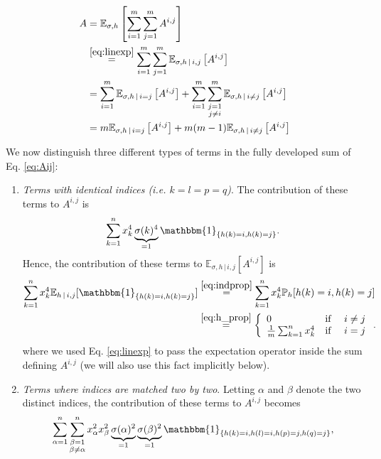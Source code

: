 \documentclass[10pt,usenames,dvipsnames]{article}
\newcommand{\Pbb}{\mathbb{P}}
\newcommand{\Ebb}{\mathbb{E}}
\newcommand{\ind}{\mathbbm{1}} %
\newenvironment{exercise}[2][Exercise]{\begin{trivlist}
  \item[\hskip \labelsep {\bfseries #1}\hskip \labelsep {\bfseries #2.}]}{\end{trivlist}}
\begin{document}
\begin{exercise}{2b}
		\begin{align}
		\label{eq:A}
		A 	& =  \Ebb_{\sigma, h}\left[ \sum_{i=1}^m \sum_{j=1}^m A^{i,j} \right] \nonumber \\
			& \overset{\eqref{eq:linexp}}{=} \sum_{i=1}^m \sum_{j=1}^m\Ebb_{\sigma, h\, | \, i,j}\left[ A^{i,j} \right] \nonumber \\
			& =  \sum_{i=1}^m \Ebb_{\sigma, h\, | \, i=j}\left[ A^{i,j} \right] + \sum_{i=1}^m \sum_{\substack{j=1 \\ j \neq i}}^m\Ebb_{\sigma, h\, | \, i\neq j}\left[ A^{i,j} \right] \nonumber \\
			& = m \Ebb_{\sigma, h \, | \, i=j}\left[ A^{i,j} \right] + m(m-1)\Ebb_{\sigma, h \, | \, i\neq j}\left[ A^{i,j} \right]
		\end{align}
		
		We now distinguish three different types of terms in the fully developed sum of Eq. \eqref{eq:Aij}:
		\begin{enumerate}
			\item \textit{Terms with identical indices (i.e. $k=l=p=q$)}. The contribution of these terms to $A^{i,j}$ is
			$$
			\sum_{k=1}^n x_k^4 \underbrace{\sigma(k)^4}_{=1} \ind_{\{h(k)=i, h(k)=j \}}.
			$$
			Hence, the contribution of these terms to $\Ebb_{\sigma, h\, | \, i,j} [A^{i,j}]$ is 
			\begin{align}
			\sum_{k=1}^n x_k^4  \Ebb_{h\, | \, i,j}[\ind_{\{h(k)=i, h(k)=j \}} ] 
			& \overset{\eqref{eq:indprop}}{=} \sum_{k=1}^n x_k^4  \Pbb_{h}[h(k)=i, h(k)=j ]
			\nonumber \\
			& \overset{\eqref{eq:h_prop}}{=} \left\{ 
				\begin{array}{lcl}
					0 & \mbox{if } & i\neq j \\
					\frac{1}{m}\sum_{k=1}^n x_k^4 & \mbox{if } & i = j \label{eq:A1} \\
				\end{array}\right..
			\end{align}
			where we used Eq. \eqref{eq:linexp} to pass the expectation operator inside the sum defining $A^{i,j}$ (we will also use this fact implicitly below).
			\item \textit{Terms where indices are matched two by two}. Letting $\alpha$ and $\beta$ denote the two distinct indices, the contribution of these terms to $A^{i,j}$ becomes
			$$
			\sum_{\alpha=1}^n \sum_{\substack{\beta=1 \\ \beta \neq \alpha}}^nx_\alpha^2 x_\beta^2 \underbrace{\sigma(\alpha)^2}_{=1} \underbrace{\sigma(\beta)^2}_{=1}\ind_{\{h(k)=i, h(l)=i, h(p)=j, h(q)=j \}},
$$
\end{enumerate}
\end{exercise}
\end{document}
